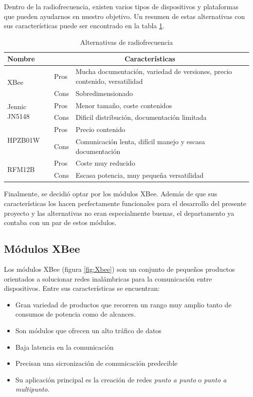 Dentro de la radiofrecuencia, existen varios tipos de dispositivos y plataformas que pueden ayudarnos en nuestro objetivo. Un resumen de estas alternativas con sus características puede ser encontrado en la tabla \ref{tab:radio}.

\begin{table}[H]
\begin{center}
\begin{tabular}{|m{3cm}|m{1cm}|m{7cm}|}
\hline
\textbf{Nombre} & \multicolumn{2}{|c|}{\textbf{Características}}\\
\hline
\hline
\multirow{2}{3cm}{XBee} & Pros & Mucha documentación, variedad de versiones, precio contenido, versatilidad\\
\cline{2-3}
& Cons & Sobredimensionado\\
\hline
\multirow{2}{3cm}{Jennic JN5148} & Pros & Menor tamaño, coste contenidos\\
\cline{2-3}
& Cons & Dificil distribución, documentación limitada\\
\hline
\multirow{2}{3cm}{HPZB01W} & Pros & Precio contenido\\
\cline{2-3}
& Cons & Comunicación lenta, difícil manejo y escasa documentación\\
\hline
\multirow{2}{3cm}{RFM12B} & Pros & Coste muy reducido\\
\cline{2-3}
& Cons & Escasa potencia, muy pequeña versatilidad\\
\hline
\end{tabular}
\end{center}
\caption{Alternativas de radiofrecuencia}
\label{tab:radio}
\end{table}

Finalmente, se decidió optar por los módulos XBee. Además de que sus características los hacen perfectamente funcionales para el desarrollo del presente proyecto y las alternativas no eran especialmente buenas, el departamento ya contaba con un par de estos módulos.

\subsection{Módulos XBee}

Los módulos XBee \cite{Xbee:2019} (figura \ref{fig:Xbee}) son un conjunto de pequeños productos orientados a solucionar redes inalámbricas para la comunicación entre dispositivos. Entre sus características se encuentran:

\begin{itemize}
\item Gran variedad de productos que recorren un rango muy amplio tanto de consumos de potencia como de alcances.
\item Son módulos que ofrecen un alto tráfico de datos
\item Baja latencia en la comunicación
\item Precisan una sicronización de comunicación predecible
\item Su aplicación principal es la creación de redes \textit{punto a punto} o \textit{punto a multipunto}.
\end{itemize}

